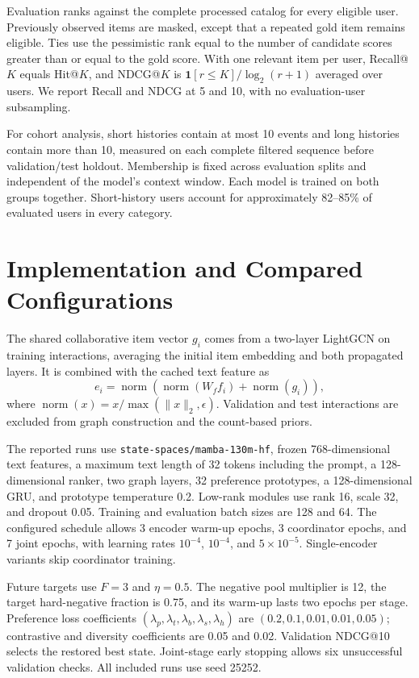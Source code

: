\documentclass[11pt]{article}
\newcommand{\norm}[1]{\operatorname{norm}(#1)}
\begin{document}
Evaluation ranks against the complete processed catalog for every eligible user. Previously observed items are masked, except that a repeated gold item remains eligible. Ties use the pessimistic rank equal to the number of candidate scores greater than or equal to the gold score. With one relevant item per user, Recall@$K$ equals Hit@$K$, and NDCG@$K$ is $\mathbf 1[r\leq K]/\log_2(r+1)$ averaged over users. We report Recall and NDCG at 5 and 10, with no evaluation-user subsampling.

For cohort analysis, short histories contain at most 10 events and long histories contain more than 10, measured on each complete filtered sequence before validation/test holdout. Membership is fixed across evaluation splits and independent of the model's context window. Each model is trained on both groups together. Short-history users account for approximately 82--85\% of evaluated users in every category.

\section{Implementation and Compared Configurations}
\label{app:implementation}
The shared collaborative item vector $g_i$ comes from a two-layer LightGCN on training interactions, averaging the initial item embedding and both propagated layers. It is combined with the cached text feature as
\begin{equation}
 e_i=\norm{\norm{W_f f_i}+\norm{g_i}},
\end{equation}
where $\norm{x}=x/\max(\lVert x\rVert_2,\epsilon)$. Validation and test interactions are excluded from graph construction and the count-based priors.

The reported runs use \texttt{state-spaces/}\allowbreak\texttt{mamba-130m-hf}, frozen 768-dimensional text features, a maximum text length of 32 tokens including the prompt, a 128-dimensional ranker, two graph layers, 32 preference prototypes, a 128-dimensional GRU, and prototype temperature 0.2. Low-rank modules use rank 16, scale 32, and dropout 0.05. Training and evaluation batch sizes are 128 and 64. The configured schedule allows 3 encoder warm-up epochs, 3 coordinator epochs, and 7 joint epochs, with learning rates $10^{-4}$, $10^{-4}$, and $5\times10^{-5}$. Single-encoder variants skip coordinator training.

Future targets use $F=3$ and $\eta=0.5$. The negative pool multiplier is 12, the target hard-negative fraction is 0.75, and its warm-up lasts two epochs per stage. Preference loss coefficients $(\lambda_p,\lambda_t,\lambda_b,\lambda_s,\lambda_h)$ are $(0.2,0.1,0.01,0.01,0.05)$; contrastive and diversity coefficients are 0.05 and 0.02. Validation NDCG@10 selects the restored best state. Joint-stage early stopping allows six unsuccessful validation checks. All included runs use seed 25252.
\end{document}
